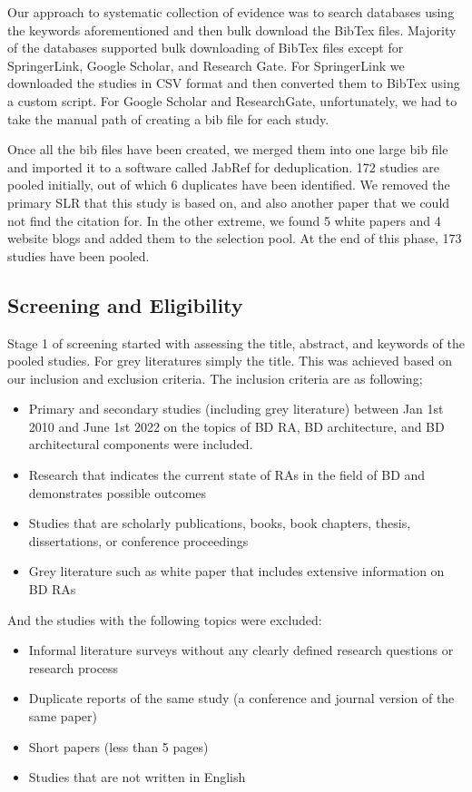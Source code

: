\documentclass{ieeeaccess}
\begin{document}
Our approach to systematic collection of evidence was to search databases using the keywords aforementioned and then bulk download the BibTex files. Majority of the databases supported bulk downloading of BibTex files except for SpringerLink, Google Scholar, and Research Gate. For SpringerLink we downloaded the studies in CSV format and then converted them to BibTex using a custom script. For Google Scholar and ResearchGate, unfortunately, we had to take the manual path of creating a bib file for each study. 

Once all the bib files have been created, we merged them into one large bib file and imported it to a software called JabRef for deduplication. 172 studies are pooled initially, out of which 6 duplicates have been identified. We removed the primary SLR that this study is based on, and also another paper that we could not find the citation for. In the other extreme, we found 5 white papers and 4 website blogs and added them to the selection pool. At the end of this phase, 173 studies have been pooled. 

\subsection{Screening and Eligibility}

Stage 1 of screening started with assessing the title, abstract, and keywords of the pooled studies. For grey literatures simply the title. This was achieved based on our inclusion and exclusion criteria. The inclusion criteria are as following;

\begin{itemize}
    \item Primary and secondary studies (including grey literature) between Jan 1st 2010 and June 1st 2022 on the topics of BD RA, BD architecture, and BD architectural components were included. 
    \item Research that indicates the current state of RAs in the field of BD and demonstrates possible outcomes
    \item Studies that are scholarly publications, books, book chapters, thesis, dissertations, or conference proceedings 
    \item Grey literature such as white paper that includes extensive information on BD RAs
\end{itemize}

And the studies with the following topics were excluded: 

\begin{itemize}
    \item Informal literature surveys without any clearly defined research questions or research process
    \item Duplicate reports of the same study (a conference and journal version of the same paper)
    \item Short papers (less than 5 pages)
    \item Studies that are not written in English
\end{itemize}
\end{document}
